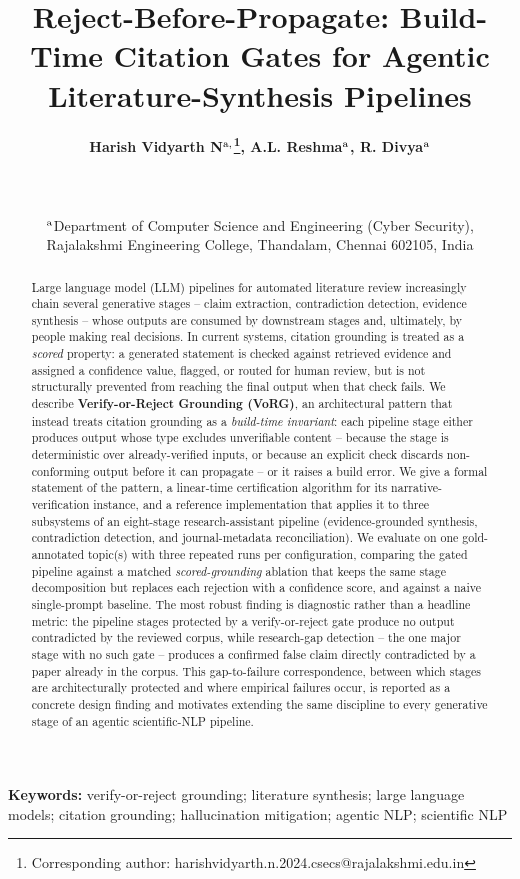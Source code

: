 \documentclass[11pt]{article}
\title{\textbf{Reject-Before-Propagate: Build-Time Citation Gates for
Agentic Literature-Synthesis Pipelines}}
\author{\begin{tabular}{rcl}
\textbf{Harish Vidyarth N$^{\text a,}$\thanks{Corresponding author: harishvidyarth.n.2024.csecs@rajalakshmi.edu.in}, A.L. Reshma$^{\text a}$, R. Divya$^{\text a}$}
\end{tabular}\\
\\
\begin{tabular}{c}
$^{\text a}$\small Department of Computer Science and Engineering (Cyber Security), \\Rajalakshmi Engineering College, Thandalam, Chennai 602105, India \\
\end{tabular}}
\date{}
\newcommand{\NumTopics}{one}     %
\newcommand{\NumRuns}{three}     %
\begin{document}
\maketitle
\vspace{-0.5cm}
\begin{abstract}
{\small Large language model (LLM) pipelines for automated literature review
increasingly chain several generative stages -- claim extraction, contradiction
detection, evidence synthesis -- whose outputs are consumed by downstream stages
and, ultimately, by people making real decisions. In current systems, citation
grounding is treated as a \emph{scored} property: a generated statement is
checked against retrieved evidence and assigned a confidence value, flagged, or
routed for human review, but is not structurally prevented from reaching the
final output when that check fails. We describe \textbf{Verify-or-Reject
Grounding (VoRG)}, an architectural pattern that instead treats citation
grounding as a \emph{build-time invariant}: each pipeline stage either produces
output whose type excludes unverifiable content -- because the stage is
deterministic over already-verified inputs, or because an explicit check
discards non-conforming output before it can propagate -- or it raises a build
error. We give a formal statement of the pattern, a linear-time certification
algorithm for its narrative-verification instance, and a reference
implementation that applies it to three subsystems of an eight-stage
research-assistant pipeline (evidence-grounded synthesis, contradiction
detection, and journal-metadata reconciliation). We evaluate on \NumTopics{}
gold-annotated topic(s) with \NumRuns{} repeated runs per configuration,
comparing the gated pipeline against a matched \emph{scored-grounding} ablation
that keeps the same stage decomposition but replaces each rejection with a
confidence score, and against a naive single-prompt baseline. The most robust
finding is diagnostic rather than a headline metric: the pipeline stages
protected by a verify-or-reject gate produce no output contradicted by the
reviewed corpus, while research-gap detection -- the one major stage with no
such gate -- produces a confirmed false claim directly contradicted by a paper
already in the corpus. This gap-to-failure correspondence, between which stages
are architecturally protected and where empirical failures occur, is reported as
a concrete design finding and motivates extending the same discipline to every
generative stage of an agentic scientific-NLP pipeline.}
\end{abstract}
\textbf{Keywords:} {\small verify-or-reject grounding; literature synthesis; large language models; citation grounding; hallucination mitigation; agentic NLP; scientific NLP}
\end{document}
